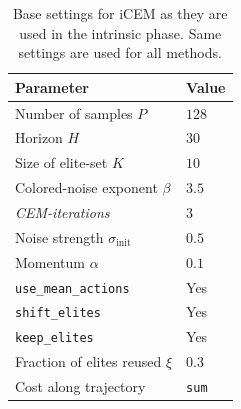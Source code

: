 \begin{table}[htb]
    \centering
    \caption{Base settings for iCEM as they are used in the intrinsic phase. Same settings are used for all methods.}
    \label{tab:controller_settings}
    \begin{subtable}[t]{.48\textwidth}
        \centering
        \begin{tabular}{@{}ll@{}}
        \toprule
        \textbf{Parameter} & \textbf{Value} \\
        \midrule
        Number of samples $P$ & $128$ \\
        Horizon $H$ & $30$ \\
        Size of elite-set $K$ & $10$ \\
        Colored-noise exponent $\beta$ & $3.5$ \\
        \textit{CEM-iterations} & $3$ \\
        Noise strength $\sigma_{\text{init}}$ & $0.5$ \\
        Momentum $\alpha$ & $0.1$ \\
        \texttt{use\_mean\_actions} & Yes \\
        \texttt{shift\_elites} & Yes \\
        \texttt{keep\_elites} & Yes \\
        Fraction of elites reused $\xi$ & $0.3$ \\
        Cost along trajectory & \texttt{sum} \\
        \bottomrule
        \end{tabular}
    \end{subtable}%
\end{table}
\begin{table}[htb]
    \centering
  \caption{iCEM hyperparameters used for zero-shot generalization in the extrinsic phase. Any settings not specified here are the same as the general settings given in .}
    \label{tab:extrinsic_controller}
    \renewcommand{\arraystretch}{1.03}

\end{table}